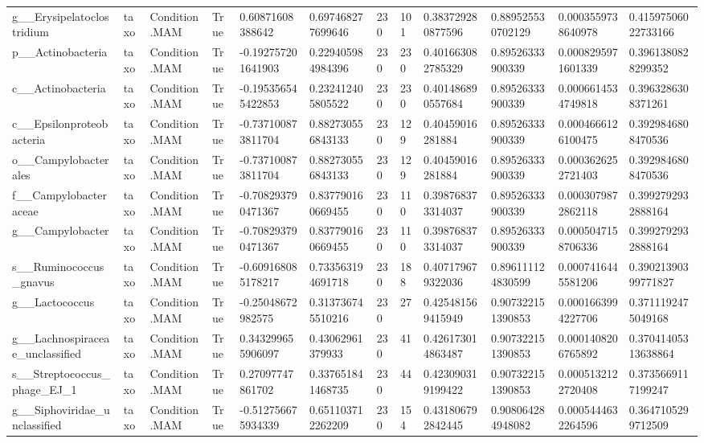 \begin{longtable}{llllllllllll}
g\_\_Erysipelatoclostridium & taxo & Condition.MAM & True & 0.60871608388642 & 0.697468277699646 & 230 & 101 & 0.383729280877596 & 0.889525530702129 & 0.0003559738640978 & 0.41597506022733166 \\
p\_\_Actinobacteria & taxo & Condition.MAM & True & -0.192757201641903 & 0.229405984984396 & 230 & 230 & 0.401663082785329 & 0.89526333900339 & 0.0008295971601339 & 0.3961380828299352 \\
c\_\_Actinobacteria & taxo & Condition.MAM & True & -0.195356545422853 & 0.232412405805522 & 230 & 230 & 0.401486890557684 & 0.89526333900339 & 0.0006614534749818 & 0.3963286308371261 \\
c\_\_Epsilonproteobacteria & taxo & Condition.MAM & True & -0.737100873811704 & 0.882730556843133 & 230 & 129 & 0.40459016281884 & 0.89526333900339 & 0.0004666126100475 & 0.3929846808470536 \\
o\_\_Campylobacterales & taxo & Condition.MAM & True & -0.737100873811704 & 0.882730556843133 & 230 & 129 & 0.40459016281884 & 0.89526333900339 & 0.0003626252721403 & 0.3929846808470536 \\
f\_\_Campylobacteraceae & taxo & Condition.MAM & True & -0.708293790471367 & 0.837790160669455 & 230 & 110 & 0.398768373314037 & 0.89526333900339 & 0.0003079872862118 & 0.3992792932888164 \\
g\_\_Campylobacter & taxo & Condition.MAM & True & -0.708293790471367 & 0.837790160669455 & 230 & 110 & 0.398768373314037 & 0.89526333900339 & 0.0005047158706336 & 0.3992792932888164 \\
s\_\_Ruminococcus\_gnavus & taxo & Condition.MAM & True & -0.609168085178217 & 0.733563194691718 & 230 & 188 & 0.407179679322036 & 0.896111124830599 & 0.0007416445581206 & 0.39021390399771827 \\
g\_\_Lactococcus & taxo & Condition.MAM & True & -0.25048672982575 & 0.313736745510216 & 230 & 27 & 0.425481569415949 & 0.907322151390853 & 0.0001663994227706 & 0.3711192475049168 \\
g\_\_Lachnospiraceae\_unclassified & taxo & Condition.MAM & True & 0.343299655906097 & 0.43062961379933 & 230 & 41 & 0.426173014863487 & 0.907322151390853 & 0.0001408206765892 & 0.37041405313638864 \\
s\_\_Streptococcus\_phage\_EJ\_1 & taxo & Condition.MAM & True & 0.27097747861702 & 0.337651841468735 & 230 & 44 & 0.423090319199422 & 0.907322151390853 & 0.0005132122720408 & 0.3735669117199247 \\
g\_\_Siphoviridae\_unclassified & taxo & Condition.MAM & True & -0.512756675934339 & 0.651103712262209 & 230 & 154 & 0.431806792842445 & 0.908064284948082 & 0.0005444632264596 & 0.3647105299712509 \\

\end{longtable}
